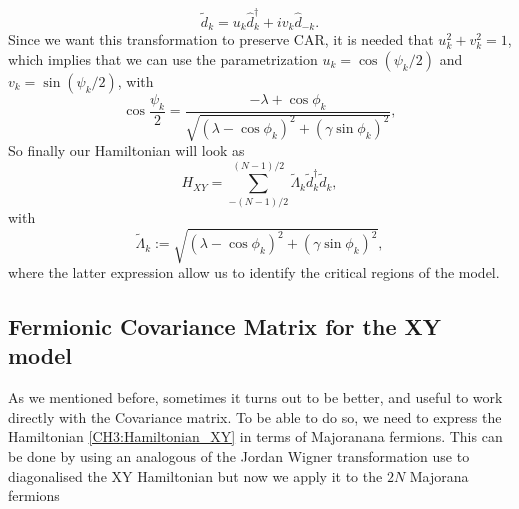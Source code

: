 \begin{equation}
\tilde{d}_{k}=u_{k} \hat{d}_{k}^{\dagger}+i v_{k} \hat{d}_{-k}.
\end{equation}
Since we want this transformation to preserve CAR, it is needed that $u_k^2 + v_k^2 = 1$, which implies that we can use the parametrization $u_{k}=\cos \left(\psi_{k} / 2\right)$ and $v_{k}=\sin \left(\psi_{k} / 2\right)$, with
\begin{equation}
\cos \frac{\psi_{k}}{2}=\frac{-\lambda+\cos \phi_{k}}{\sqrt{\left(\lambda-\cos \phi_{k}\right)^{2}+\left(\gamma \sin \phi_{k}\right)^{2}}},
\end{equation}
So finally our Hamiltonian will look as
\begin{equation}
H_{X Y}=\sum_{-(N-1) / 2}^{(N-1) / 2} \tilde{\Lambda}_{k} \tilde{d}_{k}^{\dagger} \tilde{d}_{k},
\end{equation}
with 
\begin{equation}
\tilde{\Lambda}_{k}:=\sqrt{\left(\lambda-\cos \phi_{k}\right)^{2}+\left(\gamma \sin \phi_{k}\right)^{2}},
\label{CH3:Spectrum_XY_model}
\end{equation}
where the latter expression allow us to identify the critical regions of the model.
\subsection{Fermionic Covariance Matrix for the XY model}

As we mentioned before, sometimes it turns out to be better, and useful to work directly with the Covariance matrix. To be able to do so, we need to express the Hamiltonian \eqref{CH3:Hamiltonian_XY} in terms of Majoranana fermions. This can be done by using an analogous of the Jordan Wigner transformation use to diagonalised the XY Hamiltonian but now we apply it to the $2N$ Majorana fermions

